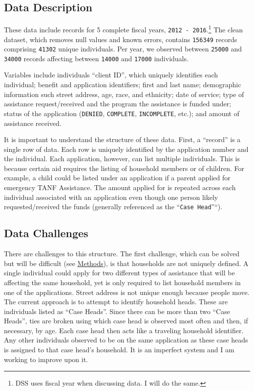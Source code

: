 \documentclass[12pt,letterpaperpaper,]{book}
\begin{document}
\subsection*{Data Description}\label{data-description}

These data include records for 5 complete fiscal years,
\texttt{2012\ -\ 2016}.\footnote{DSS uses fiscal year when discussing
  data. I will do the same.} The clean dataset, which removes null
values and known errors, contains \texttt{156349} records comprising
\texttt{41302} unique individuals. Per year, we observed between
\texttt{25000} and \texttt{34000} records affecting between
\texttt{14000} and \texttt{17000} individuals.

Variables include individuals ``client ID'', which uniquely identifies
each individual; benefit and application identifiers; first and last
name; demographic information such street address, age, race, and
ethnicity; date of service; type of assistance request/received and the
program the assistance is funded under; status of the application
(\texttt{DENIED}, \texttt{COMPLETE}, \texttt{INCOMPLETE}, etc.); and
amount of assistance received.

It is important to understand the structure of these data. First, a
``record'' is a single row of data. Each row is uniquely identified by
the application number and the individual. Each application, however,
can list multiple individuals. This is because certain aid requires the
listing of household members or of children. For example, a child could
be listed under an application if a parent applied for emergency TANF
Assistance. The amount applied for is repeated across each individual
associated with an application even though one person likely
requested/received the funds (generally referenced as the
``\texttt{Case\ Head}''``).

\subsection*{Data Challenges}\label{data-challenges}

There are challenges to this structure. The first challenge, which can
be solved but will be difficult (see
\protect\hyperlink{methods-3}{Methods}), is that households are not
uniquely defined. A single individual could apply for two different
types of assistance that will be affecting the same household, yet is
only required to list household members in one of the applications.
Street address is not unique enough because people move. The current
approach is to attempt to identify household heads. These are
individuals listed as ``Case Heads''. Since there can be more than two
``Case Heads'', ties are broken using which case head is observed most
often and then, if necessary, by age. Each case head then acts like a
traveling household identifier. Any other individuals observed to be on
the same application as these case heads is assigned to that case head's
household. It is an imperfect system and I am working to improve upon
it.
\end{document}
